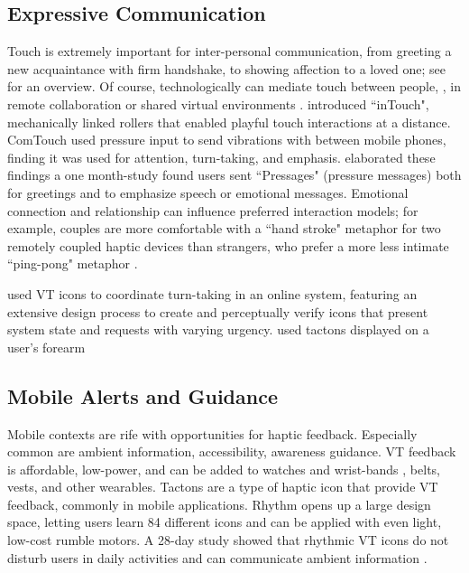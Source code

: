 \subsection{Expressive Communication}
Touch is extremely important for inter-personal communication, from greeting a new acquaintance with firm handshake, to showing affection to a loved one; see \citet{Gallace2010} for an overview.
Of course, technologically can mediate touch between people, \eg, in remote collaboration or shared virtual environments \cite{Haans2006}.
\citet{Brave1997} introduced ``inTouch", mechanically linked rollers that enabled playful touch interactions at a distance.
ComTouch \cite{Chang2002a} used pressure input to send vibrations with between mobile phones, finding it was used for attention, turn-taking, and emphasis.
\citet{Hoggan2012} elaborated these findings a one month-study found users sent ``Pressages" (pressure messages) both for greetings and to emphasize speech or emotional messages.
Emotional connection and relationship can influence preferred interaction models; for example, couples are more comfortable with a ``hand stroke" metaphor for two remotely coupled haptic devices than strangers, who prefer a more less intimate ``ping-pong" metaphor \cite{Smith2007}.


\citet{Chan2008} used VT icons to coordinate turn-taking in an online system, featuring an extensive design process to create and perceptually verify icons that present system state and requests with varying urgency.
\citet{Brown2006multidimensionaltactons} used tactons displayed on a user's forearm 





\subsection{Mobile Alerts and Guidance}
Mobile contexts are rife with opportunities for haptic feedback.
Especially common are ambient information, accessibility, awareness  guidance.
VT feedback is affordable, low-power, and can be added to watches and wrist-bands \cite{Brunet2013a,Arab2015}, belts, vests, and other wearables.
Tactons \cite{Brown2006} are a type of haptic icon \cite{MacLean2003} that provide VT feedback, commonly in mobile applications.
Rhythm opens up a large design space, letting users learn 84 different icons \cite{Ternes2008} and can be applied with even light, low-cost rumble motors.
A 28-day study showed that rhythmic VT icons do not disturb users in daily activities and can communicate ambient information \cite{Cauchard2016}.

